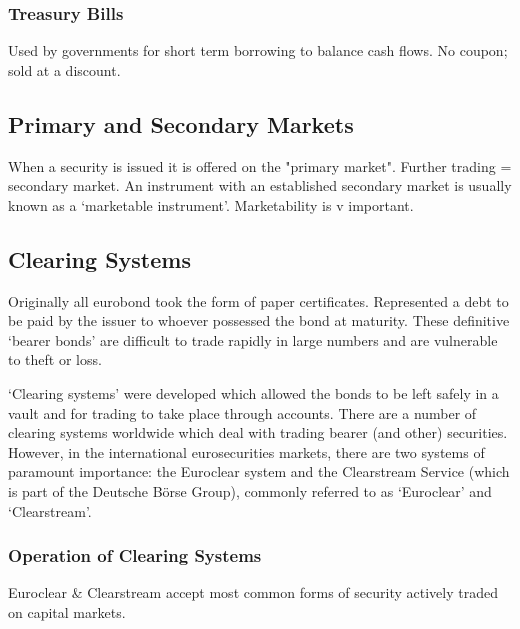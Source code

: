 \documentclass[
]{article}
\begin{document}
\hypertarget{treasury-bills}{%
\subsubsection{Treasury Bills}\label{treasury-bills}}

Used by governments for short term borrowing to balance cash flows. No
coupon; sold at a discount.

\hypertarget{primary-and-secondary-markets}{%
\subsection{Primary and Secondary
Markets}\label{primary-and-secondary-markets}}

When a security is issued it is offered on the "primary market". Further
trading = secondary market. An instrument with an established secondary
market is usually known as a `marketable instrument'. Marketability is v
important.

\hypertarget{clearing-systems}{%
\subsection{Clearing Systems}\label{clearing-systems}}

Originally all eurobond took the form of paper certificates. Represented
a debt to be paid by the issuer to whoever possessed the bond at
maturity. These definitive `bearer bonds' are difficult to trade rapidly
in large numbers and are vulnerable to theft or loss.

`Clearing systems' were developed which allowed the bonds to be left
safely in a vault and for trading to take place through accounts. There
are a number of clearing systems worldwide which deal with trading
bearer (and other) securities. However, in the international
eurosecurities markets, there are two systems of paramount importance:
the Euroclear system and the Clearstream Service (which is part of the
Deutsche Börse Group), commonly referred to as `Euroclear' and
`Clearstream'.

\hypertarget{operation-of-clearing-systems}{%
\subsubsection{Operation of Clearing
Systems}\label{operation-of-clearing-systems}}

Euroclear \& Clearstream accept most common forms of security actively
traded on capital markets.
\end{document}
